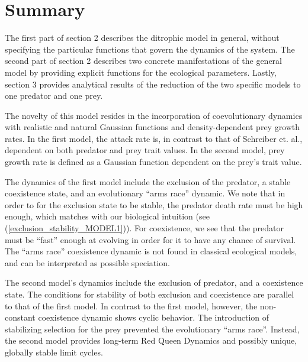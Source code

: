 \documentclass{amsart}
\theoremstyle{definition}
\theoremstyle{remark}
\numberwithin{equation}{section}
\begin{document}
\section{Summary}
The first part of section 2 describes the ditrophic model in general, without specifying the particular functions that govern the dynamics of the system.  The second part of section 2 describes two concrete manifestations of the general model by providing explicit functions for the ecological parameters.  Lastly, section 3 provides analytical results of the reduction of the two specific models to one predator and one prey.

The novelty of this model resides in the incorporation of coevolutionary dynamics with realistic and natural Gaussian functions and density-dependent prey growth rates.  In the first model, the attack rate is, in contrast to that of Schreiber et. al., dependent on both predator and prey trait values.  In the second model, prey growth rate is defined as a Gaussian function dependent on the prey's trait value.

The dynamics of the first model include the exclusion of the predator, a stable coexistence state, and an evolutionary ``arms race'' dynamic.  We note that in order to for the exclusion state to be stable, the predator death rate must be high enough, which matches with our biological intuition (see (\ref{exclusion_stability_MODEL1})).  For coexistence, we see that the predator must be ``fast'' enough at evolving in order for it to have any chance of survival.  The ``arms race'' coexistence dynamic is not found in classical ecological models, and can be interpreted as possible speciation.

The second model's dynamics include the exclusion of predator, and a coexistence state.  The conditions for stability of both exclusion and coexistence are parallel to that of the first model.  In contrast to the first model, however, the non-constant coexistence dynamic shows cyclic behavior.  The introduction of stabilizing selection for the prey prevented the evolutionary ``arms race''.  Instead, the second model provides long-term Red Queen Dynamics \cite{Khibnik_Kondrashov_1997} and possibly unique, globally stable limit cycles.



\end{document}
